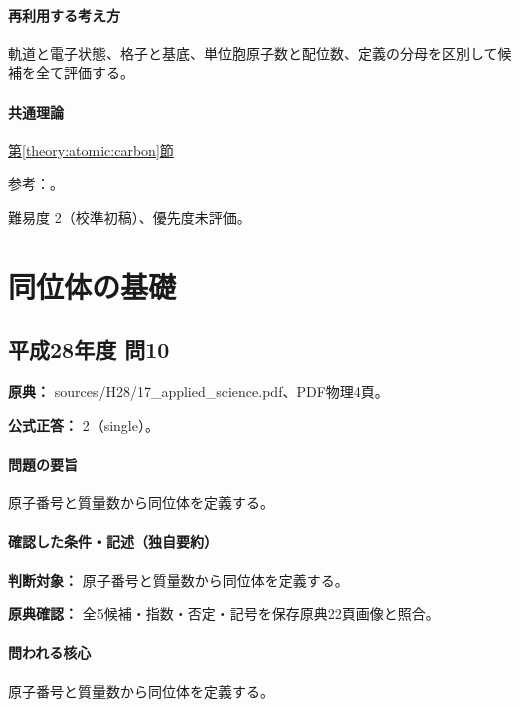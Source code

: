 \paragraph{再利用する考え方} 軌道と電子状態、格子と基底、単位胞原子数と配位数、定義の分母を区別して候補を全て評価する。

\paragraph{共通理論} \hyperref[theory:atomic:carbon]{第\ref*{theory:atomic:carbon}節}

\par 参考：\cite{atomic_cnt,atomic_diamond}。

\par 難易度 2（校準初稿）、優先度未評価。

\section{同位体の基礎}

\subsection{平成28年度 問10}
\label{q:h28-reg-applied-10}

\noindent\textbf{原典：} sources/H28/17\_applied\_science.pdf、PDF物理4頁。

\textbf{公式正答：} 2（single）。

\paragraph{問題の要旨} 原子番号と質量数から同位体を定義する。

\paragraph{確認した条件・記述（独自要約）}\mbox{}\par

\noindent\textbf{判断対象：} 原子番号と質量数から同位体を定義する。\par

\noindent\textbf{原典確認：} 全5候補・指数・否定・記号を保存原典22頁画像と照合。\par

\paragraph{問われる核心} 原子番号と質量数から同位体を定義する。


